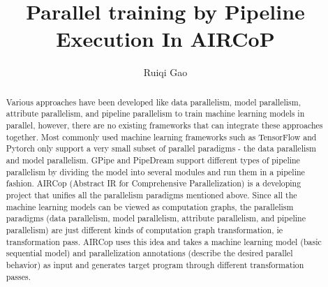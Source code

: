 \documentclass[sigplan]{acmart}\settopmatter{printfolios=true,printccs=false,printacmref=false}
\begin{document}
\sloppy

\title{Parallel training by Pipeline Execution In AIRCoP}

\author{Ruiqi Gao}




\begin{abstract}
Various approaches have been developed like data parallelism, model parallelism, attribute parallelism, and pipeline parallelism to train machine learning models in parallel, however, there are no existing frameworks that can integrate these approaches together. Most commonly used machine learning frameworks such as TensorFlow and Pytorch only support a very small subset of parallel paradigms - the data parallelism and model parallelism. GPipe and PipeDream support different types of pipeline parallelism by dividing the model into several modules and run them in a pipeline fashion.
AIRCop (Abstract IR for Comprehensive Parallelization) is a developing project that unifies all the parallelism paradigms mentioned above. Since all the machine learning models can be viewed as computation graphs, the parallelism paradigms (data parallelism, model parallelism, attribute parallelism, and pipeline parallelism) are just different kinds of computation graph transformation, ie transformation pass. AIRCop uses this idea and takes a machine learning model (basic sequential model) and parallelization annotations (describe the desired parallel behavior) as input and generates target program through different transformation passes.

\end{abstract}
\end{document}

